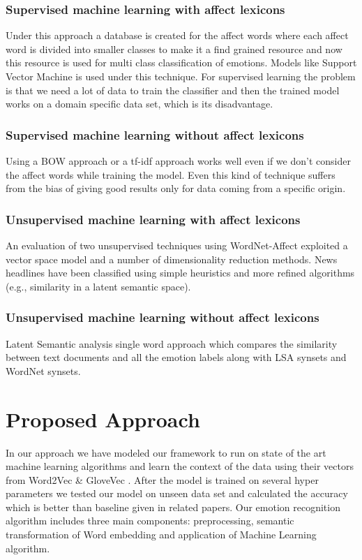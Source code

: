 \documentclass[conference]{IEEEtran}
\numberwithin{equation}{section}
\numberwithin{figure}{section}
\numberwithin{table}{section}
\begin{document}
\subsubsection{Supervised machine learning with affect lexicons}\label{sec:cap-num}
Under this approach a database is created for the affect words where each affect word is divided into smaller classes to make it a find grained resource and now this resource is used for multi class classification of emotions. Models like Support Vector Machine is used under this technique. For supervised learning the problem is that we need a lot of data to train the classifier and then the trained model works on a domain specific data set, which is its disadvantage.

\subsubsection{Supervised machine learning without affect lexicons}\label{sec:positioning}
Using a BOW approach or a tf-idf approach works well even if we don't consider the affect words while training the model. Even this kind of technique suffers from the bias of giving good results only for data coming from a specific origin.

\subsubsection{Unsupervised machine learning with affect lexicons}\label{sec:positioning}
An evaluation of two unsupervised techniques using WordNet-Affect exploited a vector space model and a number of dimensionality reduction methods. News headlines have been classified using simple heuristics and more refined algorithms (e.g., similarity in a latent semantic space).

\subsubsection{Unsupervised machine learning without affect lexicons}\label{sec:positioning} Latent Semantic analysis single word approach which compares the similarity between text documents and all the emotion labels along with LSA synsets and WordNet synsets.



\section{Proposed Approach}\label{sec:fig-tables}
In our approach we have modeled our framework to run on state of the art machine learning algorithms and learn the context of the data using their vectors from Word2Vec \cite{word2vec} \& GloveVec \cite{glove}. After the model is trained on several hyper parameters we tested our model on unseen data set and calculated the accuracy which is better than baseline given in related papers. Our emotion recognition algorithm includes three main components: preprocessing, semantic transformation of Word embedding and application of Machine Learning algorithm. 
\end{document}
